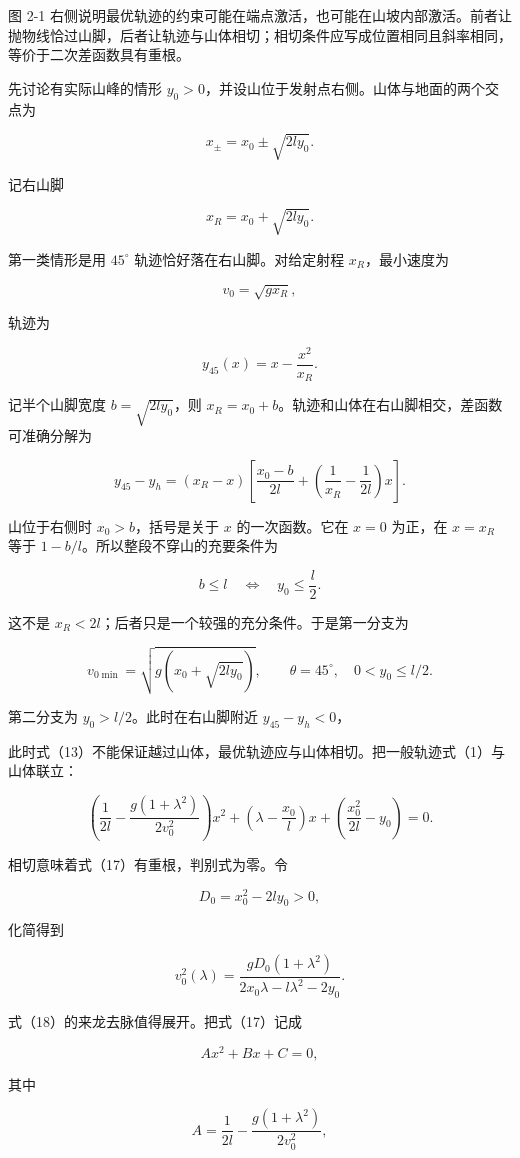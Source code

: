 \documentclass[12pt,a4paper,UTF8]{ctexart}
\begin{document}
图 2-1
右侧说明最优轨迹的约束可能在端点激活，也可能在山坡内部激活。前者让抛物线恰过山脚，后者让轨迹与山体相切；相切条件应写成位置相同且斜率相同，等价于二次差函数具有重根。

先讨论有实际山峰的情形
\(y_0>0\)，并设山位于发射点右侧。山体与地面的两个交点为

\[x_\pm=x_0\pm\sqrt{2ly_0}.\]

记右山脚

\[x_R=x_0+\sqrt{2ly_0}. \tag{12}\]

第一类情形是用 \(45^\circ\) 轨迹恰好落在右山脚。对给定射程
\(x_R\)，最小速度为

\[v_0=\sqrt{gx_R},\]

轨迹为

\[y_{45}(x)=x-\frac{x^2}{x_R}. \tag{13}\]

记半个山脚宽度 \(b=\sqrt{2ly_0}\)，则
\(x_R=x_0+b\)。轨迹和山体在右山脚相交，差函数可准确分解为

\[y_{45}-y_h=(x_R-x)\left[\frac{x_0-b}{2l}+\left(\frac1{x_R}-\frac1{2l}\right)x\right].\]

山位于右侧时 \(x_0>b\)，括号是关于 \(x\) 的一次函数。它在 \(x=0\)
为正，在 \(x=x_R\) 等于 \(1-b/l\)。所以整段不穿山的充要条件为

\[b\le l\quad\Longleftrightarrow\quad y_0\le\frac l2. \tag{14}\]

这不是 \(x_R<2l\)；后者只是一个较强的充分条件。于是第一分支为

\[\boxed{v_{0\min}=\sqrt{g(x_0+\sqrt{2ly_0})},\qquad\theta=45^\circ,\quad0<y_0\le l/2.} \tag{15}\]

第二分支为 \(y_0>l/2\)。此时在右山脚附近 \(y_{45}-y_h<0\)，

此时式（13）不能保证越过山体，最优轨迹应与山体相切。把一般轨迹式（1）与山体联立：

\[\left(\frac1{2l}-\frac{g(1+\lambda^2)}{2v_0^2}\right)x^2
+\left(\lambda-\frac{x_0}{l}\right)x
+\left(\frac{x_0^2}{2l}-y_0\right)=0. \tag{17}\]

相切意味着式（17）有重根，判别式为零。令

\[D_0=x_0^2-2ly_0>0,\]

化简得到

\[v_0^2(\lambda)
=\frac{gD_0(1+\lambda^2)}
{2x_0\lambda-l\lambda^2-2y_0}. \tag{18}\]

式（18）的来龙去脉值得展开。把式（17）记成

\[Ax^2+Bx+C=0,\]

其中

\[A=\frac1{2l}-\frac{g(1+\lambda^2)}{2v_0^2},\]
\end{document}
